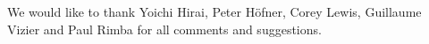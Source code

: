 \documentclass[sigplan,10pt]{acmart}\settopmatter{printfolios=true,printccs=false,printacmref=false}
\begin{document}
\begin{acks}                            %


We would like to thank Yoichi Hirai, Peter H\"ofner, Corey Lewis, Guillaume Vizier
and Paul Rimba for all comments and suggestions.
\end{acks}





\end{document}
